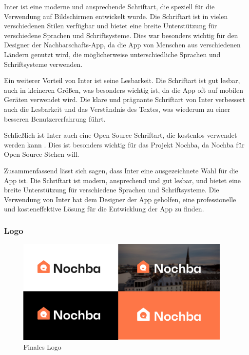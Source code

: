 Inter ist eine moderne und ansprechende Schriftart, die speziell für die Verwendung auf Bildschirmen entwickelt wurde. Die Schriftart ist in vielen verschiedenen Stilen verfügbar und bietet eine breite Unterstützung für verschiedene Sprachen und Schriftsysteme. Dies war besonders wichtig für den Designer der Nachbarschafts-App, da die App von Menschen aus verschiedenen Ländern genutzt wird, die möglicherweise unterschiedliche Sprachen und Schriftsysteme verwenden.

Ein weiterer Vorteil von Inter ist seine Lesbarkeit. Die Schriftart ist gut lesbar, auch in kleineren Größen, was besonders wichtig ist, da die App oft auf mobilen Geräten verwendet wird. Die klare und prägnante Schriftart von Inter verbessert auch die Lesbarkeit und das Verständnis des Textes, was wiederum zu einer besseren Benutzererfahrung führt.

Schließlich ist Inter auch eine Open-Source-Schriftart, die kostenlos verwendet werden kann \cite{inter-font}. Dies ist besonders wichtig für das Projekt Nochba, da Nochba für Open Source Stehen will.

Zusammenfassend lässt sich sagen, dass Inter eine ausgezeichnete Wahl für die App ist. Die Schriftart ist modern, ansprechend und gut lesbar, und bietet eine breite Unterstützung für verschiedene Sprachen und Schriftsysteme. Die Verwendung von Inter hat dem Designer der App geholfen, eine professionelle und kosteneffektive Lösung für die Entwicklung der App zu finden.
\subsubsection{Logo}

\begin{figure}[H]
  \centering
  \includegraphics[width=0.95\textwidth]{pics/final-logo.png}
  \caption{Finales Logo}
  \label{fig:final-logo}
\end{figure}

